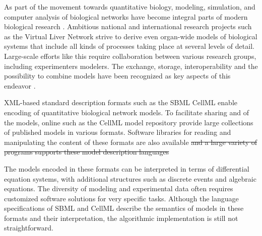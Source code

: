 \documentclass[10pt]{bmc_article}
\newenvironment{bmcformat}{\fussy\setboolean{publ}{true}}{\fussy}
\begin{document}
\begin{bmcformat}
As part of the movement towards quantitative biology,  modeling, 
simulation, and computer analysis of biological networks have become integral
parts of modern biological research \cite{Macilwain2011}.
Ambitious national and international research projects such as the Virtual Liver
Network \cite{Holzhuetter2012} strive to derive even organ-wide models of
biological systems that include all kinds of processes taking place at several
levels of detail.
Large-scale efforts like this require  collaboration between various
research groups, including experimenters\COR{,} modelers.
The exchange, storage, interoperability\COR{,} and the possibility to combine models have been recognized as
key aspects of this endeavor \cite{Schulz2006, Klipp2007, Chelliah2009, Liebermeister2009sta}.

XML-based standard description formats %
such as the \acf{SBML} \cite{M.Hucka03012003, SBML2013}  CellML
\cite{Lloyd2004, CellML2013} enable encoding of quantitative biological network
models.
To facilitate sharing and  of the models, online 
such as  \cite{Li2010a}  the CellML model
repository \cite{Lloyd2008} provide large collections of published models in
various formats.
Software libraries for reading and manipulating the content of these formats are
also available \cite{Bornstein2008, Miller2010, Draeger2011b}
\sout{and a large variety of programs supports these model description languages}

The models encoded in these formats can be interpreted in terms of 
differential equation systems, with additional structures such as
discrete events and algebraic equations.
The diversity of modeling  and experimental data often requires
customized software solutions for very specific tasks.
Although the language specifications of \acs{SBML} \cite{Hucka2001, Hucka2003,
Finney2003a, Finney2006, Hucka2007, Hucka2008, Hucka2010a} 
and CellML \cite{Cuellar2006} describe the semantics of models in these formats
and their interpretation, the algorithmic implementation is still not
straightforward.


\end{bmcformat}
\end{document}
